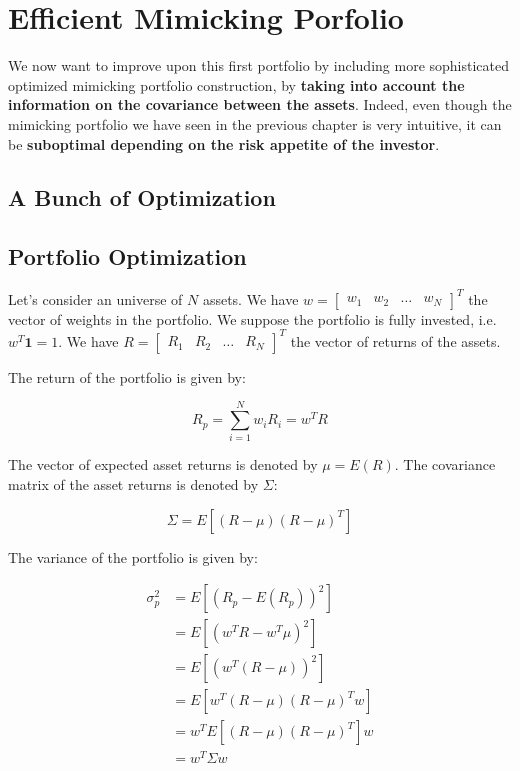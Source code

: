 \chapter{Efficient Mimicking Porfolio}
 
We now want to improve upon this first portfolio 
by including more sophisticated optimized mimicking 
portfolio construction, by \textbf{taking into account 
the information on the covariance between the 
assets}. Indeed, even though the mimicking portfolio we have 
seen in the previous chapter is very intuitive, 
it can be \textbf{suboptimal depending on the 
risk appetite of the investor}.

\section{A Bunch of Optimization}

\section{Portfolio Optimization}

Let's consider an universe of $N$ assets. 
We have $w = \begin{bmatrix}
    w_1 & w_2 & \ldots & w_N
\end{bmatrix}^T$ the vector of weights in the
portfolio.
We suppose the portfolio is fully invested, i.e.
$w^T \mathbf{1} = 1$.
We have $R = \begin{bmatrix}
    R_1 & R_2 & \ldots & R_N
\end{bmatrix}^T$ the vector of returns of the assets.

The return of the portfolio is given by:

\begin{equation}
    R_p = \sum^N_{i=1} w_i R_i = w^T R
\end{equation}

The vector of expected asset returns is denoted by $\mu = E(R)$.
The covariance matrix of the asset returns is denoted by $\Sigma$:

\begin{equation}
    \Sigma = E[(R - \mu)(R - \mu)^T]
\end{equation}

The variance of the portfolio is given by:

\begin{equation}
    \begin{aligned}
        \sigma^2_p &= E[(R_p - E(R_p))^2] \\
        &= E[(w^T R - w^T \mu)^2] \\
        &= E[(w^T (R - \mu))^2] \\
        &= E[w^T (R - \mu)(R - \mu)^T w] \\
        &= w^T E[(R - \mu)(R - \mu)^T] w \\
        &= w^T \Sigma w
    \end{aligned}
\end{equation}


